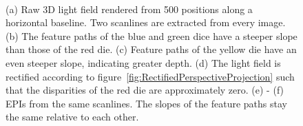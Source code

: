 \begin{figure}[tb]
	\subfigure[]{
		\centering
		
		\label{fig:epi_1x500x1000x1000_overview}
	}
	\hfill
	\subfigure[]{
		\centering
		
		\label{fig:epi_1x500x1000x1000_scanline1}
	}
	\hfill
	\subfigure[]{
		\centering
		
		\label{fig:epi_1x500x1000x1000_scanline2}
	}
	\\
	\subfigure[]{
		\centering
		
		\label{fig:epi_1x500x1000x1000_overview_rectified}
	}
	\hfill
	\subfigure[]{
		\centering
		
		\label{fig:epi_1x500x1000x1000_scanline1_rectified}
	}
	\hfill
	\subfigure[]{
		\centering
		
		\label{fig:epi_1x500x1000x1000_scanline2_rectified}
	}
	\caption{(a) Raw 3D light field rendered from 500 positions along a horizontal baseline.
				 Two scanlines are extracted from every image. 
			 (b) The feature paths of the blue and green dice have a steeper slope than those of the red die.
			 (c) Feature paths of the yellow die have an even steeper slope, indicating greater depth.
			 (d) The light field is rectified according to figure~\ref{fig:RectifiedPerspectiveProjection} such that the disparities of the red die are approximately zero.
			 (e) - (f) EPIs from the same scanlines. The slopes of the feature paths stay the same relative to each other. }
	\label{fig:epi_example_perspective}
\end{figure}
